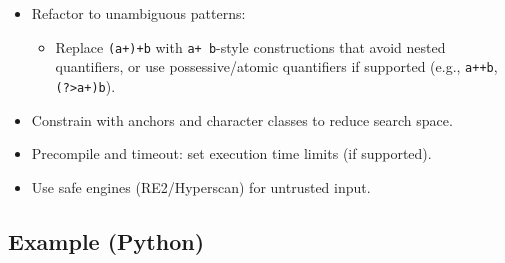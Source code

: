 \documentclass[
  letterpaper,
  DIV=11,
  numbers=noendperiod]{scrreprt}
\providecommand{\tightlist}{%
  \setlength{\itemsep}{0pt}\setlength{\parskip}{0pt}}
\begin{document}
\begin{enumerate}
  \begin{itemize}
  \item
    Refactor to unambiguous patterns:

    \begin{itemize}
    \tightlist
    \item
      Replace \texttt{(a+)+b} with \texttt{a+\ b}-style constructions
      that avoid nested quantifiers, or use possessive/atomic
      quantifiers if supported (e.g., \texttt{a++b},
      \texttt{(?\textgreater{}a+)b}).
    \end{itemize}
  \item
    Constrain with anchors and character classes to reduce search space.
  \item
    Precompile and timeout: set execution time limits (if supported).
  \item
    Use safe engines (RE2/Hyperscan) for untrusted input.
  \end{itemize}
\end{enumerate}

\subsection{Example (Python)}\label{example-python-9}
\end{document}
